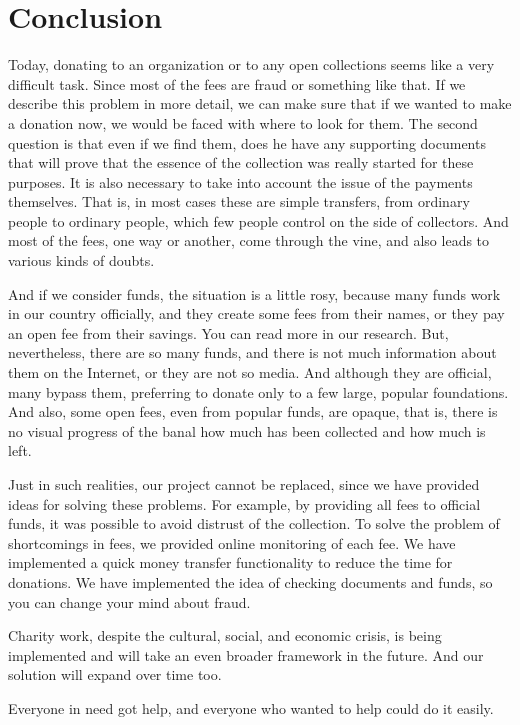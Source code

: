 \chapter{Conclusion}\label{ch:concl}
Today, donating to an organization or to any open collections seems like a very
difficult task. Since most of the fees are fraud or something like that. If we
describe this problem in more detail, we can make sure that if we wanted
to make a donation now, we would be faced with where to look for them. The second
question is that even if we find them, does he have any supporting documents that
will prove that the essence of the collection was really started for these purposes.
It is also necessary to take into account the issue of the payments themselves.
That is, in most cases these are simple transfers, from ordinary people to ordinary
people, which few people control on the side of collectors. And most of
the fees, one way or another, come through the vine, and also leads to various kinds of doubts.

And if we consider funds, the situation is a little rosy, because many
funds work in our country officially, and they create some fees from their names,
or they pay an open fee from their savings. You can read more in our research.
But, nevertheless, there are so many funds, and there is not much information about them
on the Internet, or they are not so media. And although they are official, many
bypass them, preferring to donate only to a few large, popular foundations. And
also, some open fees, even from popular funds, are opaque, that
is, there is no visual progress of the banal how much has been collected and how
much is left.

Just in such realities, our project cannot be replaced, since we have provided ideas for solving these problems. For example, by providing all fees to official funds, it was possible to avoid distrust of the collection. To solve the problem of shortcomings in fees, we provided online monitoring of each fee. We have implemented a quick money transfer functionality to reduce the time for donations. We have implemented the idea of checking documents and funds, so you can change your mind about fraud.

Charity work, despite the cultural, social, and economic crisis, is being implemented and will take an even broader framework in the future. And our solution will expand over time too. 

Everyone in need got help, and everyone who wanted to help could do it easily.